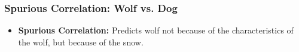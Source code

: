 \subsubsection{Spurious Correlation: Wolf vs. Dog}
\begin{example}
    \begin{itemize}
        \item \textbf{Spurious Correlation:} Predicts wolf not because of the characteristics of the wolf, but because of the snow.
    \end{itemize}
\end{example}
